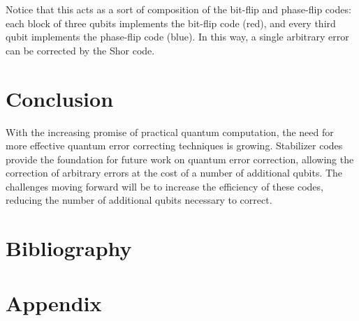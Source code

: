 \documentclass{article}
\begin{document}
                Notice that this acts as a sort of composition of the bit-flip and phase-flip codes: each block of three qubits implements the bit-flip code (red), and every third qubit implements the phase-flip code (blue).
                In this way, a single arbitrary error can be corrected by the Shor code.

\section{Conclusion}
        
        With the increasing promise of practical quantum computation, the need for more effective quantum error correcting techniques is growing.
        Stabilizer codes provide the foundation for future work on quantum error correction, allowing the correction of arbitrary errors at the cost of a number of additional qubits.
        The challenges moving forward will be to increase the efficiency of these codes, reducing the number of additional qubits necessary to correct.


\newpage
\section{Bibliography}
        \nocite{*}
        \printbibliography

\newpage
\section{Appendix}\label{appendix}
\end{document}
